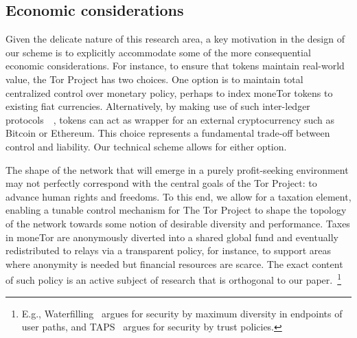 
\subsection{Economic considerations}



Given the delicate nature of this research area, a key motivation in the design
of our scheme is to explicitly accommodate some of the more consequential
economic considerations. For instance, to ensure that tokens maintain real-world
value, the Tor Project has two choices. One option is to maintain total
centralized control over monetary policy, perhaps to index moneTor tokens to
existing fiat currencies. Alternatively, by making use of such inter-ledger
protocols~\cite{back2014enabling}~\cite{poon2017plasma}, tokens can act as
wrapper for an external cryptocurrency such as Bitcoin or Ethereum. This choice
represents a fundamental trade-off between control and liability. Our technical
scheme allows for either option.

The shape of the network that will emerge in a purely profit-seeking environment
may not perfectly correspond with the central goals of the Tor Project: to
advance human rights and freedoms. To this end, we allow for a taxation element,
enabling a tunable control mechanism for The Tor Project to shape the topology
of the network towards some notion of desirable diversity and performance. Taxes
in moneTor are anonymously diverted into a shared global fund and eventually
redistributed to relays via a transparent policy, for instance, to support areas
where anonymity is needed but financial resources are scarce. The exact content
of such policy is an active subject of research that is orthogonal to our
paper.~\footnote{E.g., Waterfilling~\cite{waterfilling-pets2017} argues for
  security by maximum diversity in endpoints of user paths, and
  TAPS~\cite{taps-ndss2017} argues for security by trust policies.}

